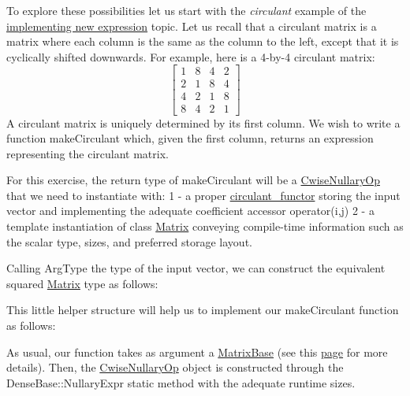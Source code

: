 To explore these possibilities let us start with the {\itshape circulant} example of the \hyperlink{TopicNewExpressionType}{implementing new expression} topic. Let us recall that a circulant matrix is a matrix where each column is the same as the column to the left, except that it is cyclically shifted downwards. For example, here is a 4-\/by-\/4 circulant matrix\+: \[ \begin{bmatrix} 1 & 8 & 4 & 2 \\ 2 & 1 & 8 & 4 \\ 4 & 2 & 1 & 8 \\ 8 & 4 & 2 & 1 \end{bmatrix} \] A circulant matrix is uniquely determined by its first column. We wish to write a function {\ttfamily make\+Circulant} which, given the first column, returns an expression representing the circulant matrix.

For this exercise, the return type of {\ttfamily make\+Circulant} will be a \hyperlink{group___core___module_class_eigen_1_1_cwise_nullary_op}{Cwise\+Nullary\+Op} that we need to instantiate with\+: 1 -\/ a proper {\ttfamily \hyperlink{classcirculant__functor}{circulant\+\_\+functor}} storing the input vector and implementing the adequate coefficient accessor {\ttfamily operator(i,j)} 2 -\/ a template instantiation of class \hyperlink{group___core___module_class_eigen_1_1_matrix}{Matrix} conveying compile-\/time information such as the scalar type, sizes, and preferred storage layout.

Calling {\ttfamily Arg\+Type} the type of the input vector, we can construct the equivalent squared \hyperlink{group___core___module_class_eigen_1_1_matrix}{Matrix} type as follows\+:


\begin{DoxyCodeInclude}
\end{DoxyCodeInclude}
 This little helper structure will help us to implement our {\ttfamily make\+Circulant} function as follows\+:


\begin{DoxyCodeInclude}
\end{DoxyCodeInclude}
 As usual, our function takes as argument a {\ttfamily \hyperlink{group___core___module_class_eigen_1_1_matrix_base}{Matrix\+Base}} (see this \hyperlink{TopicFunctionTakingEigenTypes}{page} for more details). Then, the \hyperlink{group___core___module_class_eigen_1_1_cwise_nullary_op}{Cwise\+Nullary\+Op} object is constructed through the Dense\+Base\+::\+Nullary\+Expr static method with the adequate runtime sizes.

